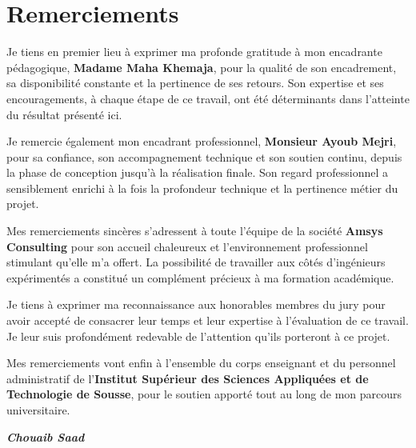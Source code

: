 \chapter*{Remerciements}
\thispagestyle{empty}

Je tiens en premier lieu à exprimer ma profonde gratitude à mon encadrante
pédagogique, \textbf{Madame Maha Khemaja}, pour la qualité de son
encadrement, sa disponibilité constante et la pertinence de ses retours.
Son expertise et ses encouragements, à chaque étape de ce travail, ont été
déterminants dans l'atteinte du résultat présenté ici.

Je remercie également mon encadrant professionnel, \textbf{Monsieur Ayoub
Mejri}, pour sa confiance, son accompagnement technique et son soutien
continu, depuis la phase de conception jusqu'à la réalisation finale. Son
regard professionnel a sensiblement enrichi à la fois la profondeur
technique et la pertinence métier du projet.

Mes remerciements sincères s'adressent à toute l'équipe de la société
\textbf{Amsys Consulting} pour son accueil chaleureux et l'environnement
professionnel stimulant qu'elle m'a offert. La possibilité de travailler
aux côtés d'ingénieurs expérimentés a constitué un complément précieux à
ma formation académique.

Je tiens à exprimer ma reconnaissance aux honorables membres du jury pour
avoir accepté de consacrer leur temps et leur expertise à l'évaluation de
ce travail. Je leur suis profondément redevable de l'attention qu'ils
porteront à ce projet.

Mes remerciements vont enfin à l'ensemble du corps enseignant et du
personnel administratif de l'\textbf{Institut Supérieur des Sciences
Appliquées et de Technologie de Sousse}, pour le soutien apporté tout au
long de mon parcours universitaire.

\bigskip\bigskip
\begin{flushright}
\textit{\textbf{Chouaib Saad}}
\end{flushright}
